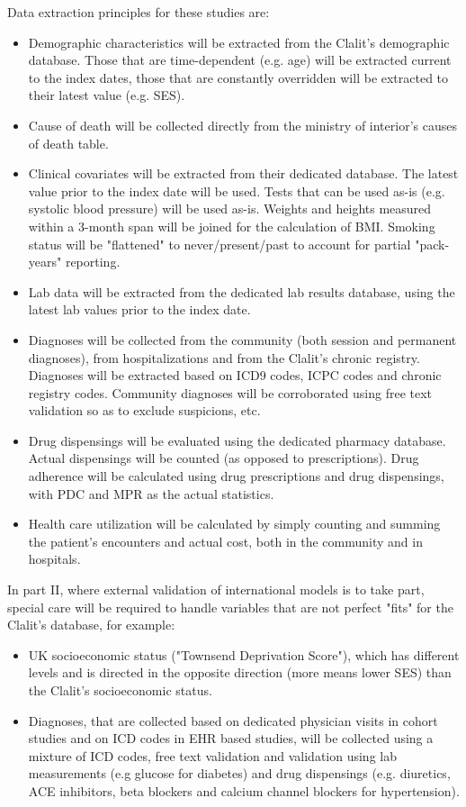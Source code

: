 \documentclass[a4paper,12pt]{article}
\begin{document}
	Data extraction principles for these studies are:
	\begin{itemize}
		\item Demographic characteristics will be extracted from the Clalit's demographic database. Those that are time-dependent (e.g. age) will be extracted current to the index dates, those that are constantly overridden will be extracted to their latest value (e.g. SES).
		\item Cause of death will be collected directly from the ministry of interior's causes of death table.
		\item Clinical covariates will be extracted from their dedicated database. The latest value prior to the index date will be used. Tests that can be used as-is (e.g. systolic blood pressure) will be used as-is. Weights and heights measured within a 3-month span will be joined for the calculation of BMI. Smoking status will be "flattened" to never/present/past to account for partial "pack-years" reporting.
		\item Lab data will be extracted from the dedicated lab results database, using the latest lab values prior to the index date.
		\item Diagnoses will be collected from the community (both session and permanent diagnoses), from hospitalizations and from the Clalit's chronic registry\cite{Rennert2001}. Diagnoses will be extracted based on ICD9 codes, ICPC codes and chronic registry codes. Community diagnoses will be corroborated using free text validation so as to exclude suspicions, etc.
		\item Drug dispensings will be evaluated using the dedicated pharmacy database. Actual dispensings will be counted (as opposed to prescriptions). Drug adherence will be calculated using drug prescriptions and drug dispensings, with PDC and MPR as the actual statistics\cite{Lam2015}.
		\item Health care utilization will be calculated by simply counting and summing the patient's encounters and actual cost, both in the community and in hospitals.
	\end{itemize}

	In part II, where external validation of international models is to take part, special care will be required to handle variables that are not perfect "fits" for the Clalit's database, for example:
	\begin{itemize}
		\item UK socioeconomic status ("Townsend Deprivation Score"), which has different levels and is directed in the opposite direction (more means lower SES) than the Clalit's socioeconomic status.
		\item Diagnoses, that are collected based on dedicated physician visits in cohort studies and on ICD codes in EHR based studies, will be collected using a mixture of ICD codes, free text validation and validation using lab measurements (e.g glucose for diabetes) and drug dispensings (e.g. diuretics, ACE inhibitors, beta blockers and calcium channel blockers for hypertension).
	\end{itemize}
\end{document}
